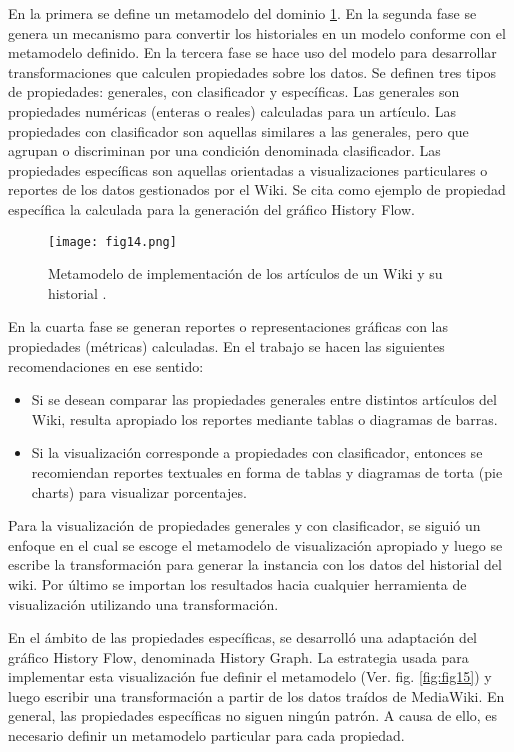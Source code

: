 En la primera se define un metamodelo del dominio \ref{fig:fig14}. En la segunda fase se genera un mecanismo para convertir los historiales en un modelo conforme con el metamodelo definido. En la tercera fase se hace uso del modelo para desarrollar transformaciones que calculen propiedades sobre los datos. Se definen tres tipos de propiedades: generales, con clasificador y específicas. Las generales son propiedades numéricas (enteras o reales) calculadas para un artículo. Las propiedades con clasificador son aquellas similares a las generales, pero que agrupan o discriminan por una condición denominada clasificador. Las propiedades específicas son aquellas orientadas a visualizaciones particulares o reportes de los datos gestionados por el Wiki. Se cita como ejemplo de propiedad específica la calculada para la generación del gráfico History Flow.

\begin{figure}[htp]
  \centering
  \texttt{[image: fig14.png]}
  \caption[Metamodelo de implementación de los artículos de un Wiki y su historial]{Metamodelo de implementación de los artículos de un Wiki y su historial \cite[Fig. 2]{Sca08}.}
  \label{fig:fig14}
\end{figure}

En la cuarta fase se generan reportes o representaciones gráficas con las propiedades (métricas) calculadas. En el trabajo se hacen las siguientes recomendaciones en ese sentido:

\begin{itemize}
  \item Si se desean comparar las propiedades generales entre distintos artículos del Wiki, resulta apropiado los reportes mediante tablas o diagramas de barras.
  \item Si la visualización corresponde a propiedades con clasificador, entonces se recomiendan reportes textuales en forma de tablas y diagramas de torta (pie charts) para visualizar porcentajes.
\end{itemize}

Para la visualización de propiedades generales y con clasificador, se siguió un enfoque en el cual se escoge el metamodelo de visualización apropiado y luego se escribe la transformación para generar la instancia con los datos del historial del wiki. Por último se importan los resultados hacia cualquier herramienta de visualización utilizando una transformación.

En el ámbito de las propiedades específicas, se desarrolló una adaptación del gráfico History Flow, denominada History Graph. La estrategia usada para implementar esta visualización fue definir el metamodelo (Ver. fig. \ref{fig:fig15}) y luego escribir una transformación a partir de los datos traídos de MediaWiki. En general, las propiedades específicas no siguen ningún patrón. A causa de ello, es necesario definir un metamodelo particular para cada propiedad.

